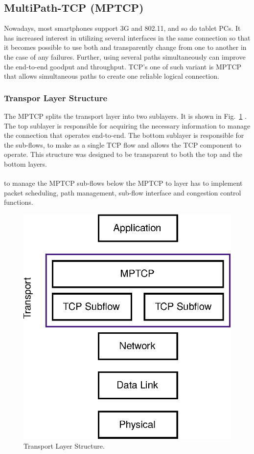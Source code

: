 \subsection{MultiPath-TCP (MPTCP)}
Nowadays, most smartphones support 3G and 802.11, and so do tablet PCs. It has increased interest in
utilizing several interfaces in the same connection so that it
becomes possible to use both and transparently change from one to another in the case of any failures. Further, using several paths simultaneously can improve the end-to-end goodput and throughput. TCP's one of such variant is MPTCP that allows simultaneous paths to create one reliable logical connection.

\subsubsection{Transpor Layer Structure}
The MPTCP splits the transport layer into two sublayers. It is shown in Fig.~\ref{fig:TransportLayerStructure} \cite{barreia2014multipath}. The top sublayer is responsible for acquiring the necessary information to manage the connection that operates end-to-end. The bottom sublayer is responsible for the sub-flows, to make as a single TCP flow and allows the TCP component to operate. This structure was designed to be transparent to both the top and the bottom layers.

\paragraph{} to manage the MPTCP sub-flows below the MPTCP to layer has to implement packet scheduling, path management, sub-flow interface and congestion control functions.

\begin{figure}[h]
    \centering
    \includegraphics[width=.6\textwidth]{img/mptcp/mptcp_str}
    \caption{Transport Layer Structure.}
    \label{fig:TransportLayerStructure}
\end{figure}

